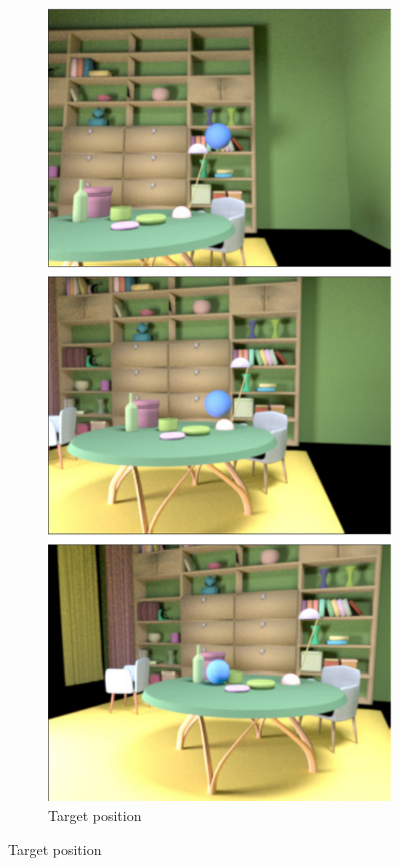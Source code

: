 \documentclass{jov}
\begin{document}
\begin{figure}
	\begin{subfigure}{0.18 \textwidth}
    \centering
        \caption{Target position}
        \includegraphics[width=\textwidth]{../FiguresDraft5/Figure4/Figure4_a.pdf}

\end{subfigure}
\end{figure}
\end{document}
